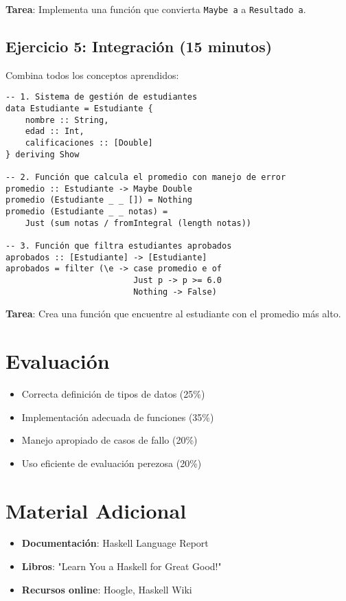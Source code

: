\documentclass[12pt]{article}
\begin{document}
\textbf{Tarea}: Implementa una función que convierta \texttt{Maybe a} a \texttt{Resultado a}.

\subsection{Ejercicio 5: Integración (15 minutos)}

Combina todos los conceptos aprendidos:

\begin{lstlisting}
-- 1. Sistema de gestión de estudiantes
data Estudiante = Estudiante {
    nombre :: String,
    edad :: Int,
    calificaciones :: [Double]
} deriving Show

-- 2. Función que calcula el promedio con manejo de error
promedio :: Estudiante -> Maybe Double
promedio (Estudiante _ _ []) = Nothing
promedio (Estudiante _ _ notas) = 
    Just (sum notas / fromIntegral (length notas))

-- 3. Función que filtra estudiantes aprobados
aprobados :: [Estudiante] -> [Estudiante]
aprobados = filter (\e -> case promedio e of
                          Just p -> p >= 6.0
                          Nothing -> False)
\end{lstlisting}

\textbf{Tarea}: Crea una función que encuentre al estudiante con el promedio más alto.

\section*{Evaluación}
\begin{itemize}
    \item Correcta definición de tipos de datos (25\%)
    \item Implementación adecuada de funciones (35\%)
    \item Manejo apropiado de casos de fallo (20\%)
    \item Uso eficiente de evaluación perezosa (20\%)
\end{itemize}

\section*{Material Adicional}
\begin{itemize}
    \item \textbf{Documentación}: Haskell Language Report
    \item \textbf{Libros}: "Learn You a Haskell for Great Good!"
    \item \textbf{Recursos online}: Hoogle, Haskell Wiki
\end{itemize}
\end{document}
